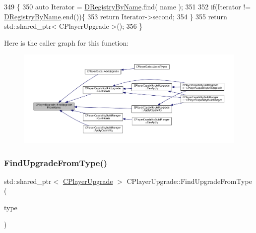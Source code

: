 \begin{DoxyCode}
349                                                                                         \{
350     \textcolor{keyword}{auto} Iterator = \hyperlink{classCPlayerUpgrade_a33e022bd67ce2f4d9ce83dfd0b7289f6}{DRegistryByName}.find( name );
351     
352     \textcolor{keywordflow}{if}(Iterator != \hyperlink{classCPlayerUpgrade_a33e022bd67ce2f4d9ce83dfd0b7289f6}{DRegistryByName}.end())\{
353         \textcolor{keywordflow}{return} Iterator->second;    
354     \}
355     \textcolor{keywordflow}{return} std::shared\_ptr< CPlayerUpgrade >();
356 \}
\end{DoxyCode}
Here is the caller graph for this function\+:
\nopagebreak
\begin{figure}[H]
\begin{center}
\leavevmode
\includegraphics[width=350pt]{classCPlayerUpgrade_af47a08aba3a1a5b2cefacef24065a82e_icgraph}
\end{center}
\end{figure}
\hypertarget{classCPlayerUpgrade_a05c0124e952cc3f52108bdf6d2b76192}{}\label{classCPlayerUpgrade_a05c0124e952cc3f52108bdf6d2b76192} 
\subsubsection{\texorpdfstring{Find\+Upgrade\+From\+Type()}{FindUpgradeFromType()}}
{\footnotesize\ttfamily std\+::shared\+\_\+ptr$<$ \hyperlink{classCPlayerUpgrade}{C\+Player\+Upgrade} $>$ C\+Player\+Upgrade\+::\+Find\+Upgrade\+From\+Type (\begin{DoxyParamCaption}\item[{\hyperlink{GameDataTypes_8h_a35b98ce26aca678b03c6f9f76e4778ce}{E\+Asset\+Capability\+Type}}]{type }\end{DoxyParamCaption})\hspace{0.3cm}{\ttfamily [static]}}



